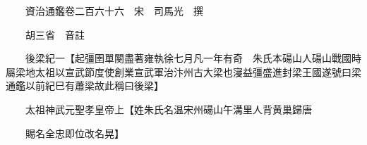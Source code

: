 










 


 
 


 

  
  
  
  
  





  
  
  
  
  
 
  

  

  
  
  



  

 
 

  
   




  

  
  


  　　資治通鑑卷二百六十六　宋　司馬光　撰

　　胡三省　音註

　　後梁紀一【起彊圉單闋盡著雍執徐七月凡一年有奇　朱氏本碭山人碭山戰國時屬梁地太祖以宣武節度使創業宣武軍治汴州古大梁也寖益彊盛進封梁王國遂號曰梁通鑑以前紀巳有蕭梁故此稱曰後梁】

　　太祖神武元聖孝皇帝上【姓朱氏名温宋州碭山午溝里人背黄巢歸唐

　　賜名全忠即位改名晃】

